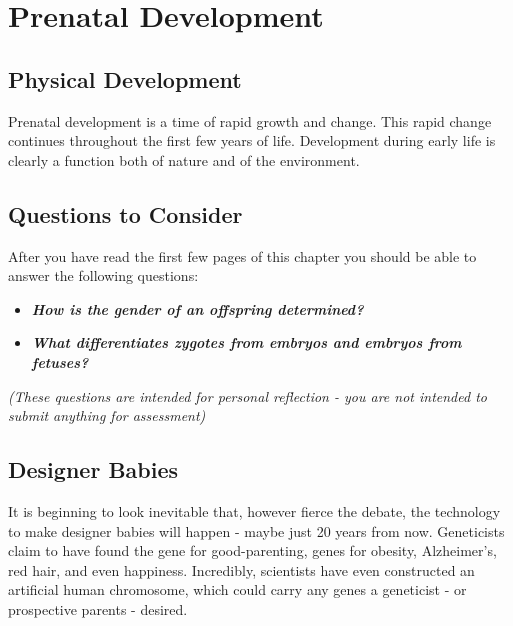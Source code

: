 \documentclass[
]{book}
\providecommand{\tightlist}{%
  \setlength{\itemsep}{0pt}\setlength{\parskip}{0pt}}
\begin{document}
\hypertarget{prenatal-development}{%
\section{Prenatal Development}\label{prenatal-development}}

\hypertarget{physical-development}{%
\subsection*{Physical Development}\label{physical-development}}

Prenatal development is a time of rapid growth and change. This rapid change continues throughout the first few years of life. Development during early life is clearly a function both of nature and of the environment.

\hypertarget{questions-to-consider}{%
\subsection*{Questions to Consider}\label{questions-to-consider}}

After you have read the first few pages of this chapter you should be able to answer the following questions:

\begin{itemize}
\tightlist
\item
  \textbf{\emph{How is the gender of an offspring determined?}}\\
\item
  \textbf{\emph{What differentiates zygotes from embryos and embryos from fetuses?}}
\end{itemize}

\emph{(These questions are intended for personal reflection - you are not intended to submit anything for assessment)}

\hypertarget{designer-babies}{%
\subsection*{Designer Babies}\label{designer-babies}}

It is beginning to look inevitable that, however fierce the debate, the technology to make designer babies will happen - maybe just 20 years from now. Geneticists claim to have found the gene for good-parenting, genes for obesity, Alzheimer's, red hair, and even happiness. Incredibly, scientists have even constructed an artificial human chromosome, which could carry any genes a geneticist - or prospective parents - desired.
\end{document}
